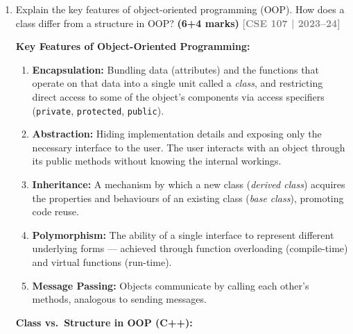\documentclass[12pt,a3paper]{article}
\newcommand{\yr}[1]{\hfill\textcolor{gray}{\small\textbf{[#1]}}}
\newcommand{\mk}[1]{\textcolor{orange!70!black}{\small\textbf{(#1 marks)}}}
\begin{document}
\begin{enumerate}
\item Explain the key features of object-oriented programming (OOP). How does a class differ from a structure in OOP? \mk{6+4}
\yr{CSE 107 | 2023--24}

\begin{tcolorbox}[enhanced,breakable,ansbox,colback=cA!4,colframe=cA,
  boxrule=0.8pt,arc=5pt,
  title={\textbf{Answer}},fonttitle=\bfseries\color{white},colbacktitle=cA]

\textbf{Key Features of Object-Oriented Programming:}

\begin{enumerate}[label=\textbf{\arabic*.}]
  \item \textbf{Encapsulation:} Bundling data (attributes) and the
    functions that operate on that data into a single unit called a
    \emph{class}, and restricting direct access to some of the
    object's components via access specifiers (\texttt{private},
    \texttt{protected}, \texttt{public}).

  \item \textbf{Abstraction:} Hiding implementation details and
    exposing only the necessary interface to the user.  The user
    interacts with an object through its public methods without
    knowing the internal workings.

  \item \textbf{Inheritance:} A mechanism by which a new class
    (\emph{derived class}) acquires the properties and behaviours of
    an existing class (\emph{base class}), promoting code reuse.

  \item \textbf{Polymorphism:} The ability of a single interface to
    represent different underlying forms --- achieved through function
    overloading (compile-time) and virtual functions (run-time).

  \item \textbf{Message Passing:} Objects communicate by calling each
    other's methods, analogous to sending messages.
\end{enumerate}

\medskip
\textbf{Class vs.\ Structure in OOP (C++):}


\end{tcolorbox}
\end{enumerate}
\end{document}
